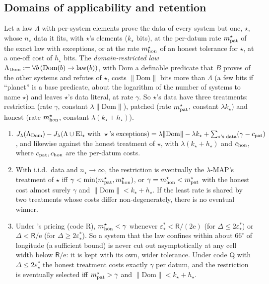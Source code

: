 \subsection{Domains of applicability and retention}\label{app:laws:domains}

Let a law $\Lambda$ with per-system elements prove the data of every system but one, $\star$, whose $n_\star$ data it fits, with $\star$'s elements ($k_\star$ bits), at the per-datum rate $m^\star_{\rm pat}$ of the exact law with exceptions, or at the rate $m^\star_{\rm hon}$ of an honest tolerance for $\star$, at a one-off cost of $h_\star$ bits. The \emph{domain-restricted law} $\Lambda_{\rm Dom}:=\forall b\,(\mathrm{Dom}(b)\to\mathrm{law}(b))$, with $\mathrm{Dom}$ a definable predicate that $B$ proves of the other systems and refutes of $\star$, costs $\lVert\mathrm{Dom}\rVert$ bits more than $\Lambda$ (a few bits if ``planet'' is a base predicate, about the logarithm of the number of systems to name $\star$) and leaves $\star$'s data literal, at rate $\gamma$. So $\star$'s data have three treatments: restriction (rate $\gamma$, constant $\lambda\lVert\mathrm{Dom}\rVert$), patched (rate $m^\star_{\rm pat}$, constant $\lambda k_\star$) and honest (rate $m^\star_{\rm hon}$, constant $\lambda(k_\star+h_\star)$).

\begin{proposition}\label{prop:laws:domain}
\leavevmode
\begin{enumerate}[label=(\alph*),itemsep=1pt,topsep=2pt]
\item $J_\lambda(\Lambda_{\rm Dom})-J_\lambda(\Lambda\cup\mathrm{El}_\star\text{ with }\star\text{'s exceptions})=\lambda\lVert\mathrm{Dom}\rVert-\lambda k_\star+\sum_{\star\text{'s data}}(\gamma-c_{\rm pat})$, and likewise against the honest treatment of $\star$, with $\lambda(k_\star+h_\star)$ and $c_{\rm hon}$, where $c_{\rm pat},c_{\rm hon}$ are the per-datum costs.
\item With i.i.d.\ data and $n_\star\to\infty$, the restriction is eventually the $\lambda$-MAP's treatment of $\star$ iff $\gamma<\min(m^\star_{\rm pat},m^\star_{\rm hon})$, or $\gamma=m^\star_{\rm hon}<m^\star_{\rm pat}$ with the honest cost almost surely $\gamma$ and $\lVert\mathrm{Dom}\rVert<k_\star+h_\star$. If the least rate is shared by two treatments whose costs differ non-degenerately, there is no eventual winner.
\item Under \SAIabbr's pricing (code R), $m^\star_{\rm hon}<\gamma$ whenever $\varepsilon^*_\star<\mathsf R/(2\mathrm e)$ (for $\Delta\le2\varepsilon^*_\star$) or $\Delta<\mathsf R/\mathrm e$ (for $\Delta\ge2\varepsilon^*_\star$). So a system that the law confines within about $66^\circ$ of longitude (a sufficient bound) is never cut out asymptotically at any cell width below $\mathsf R/\mathrm e$: it is kept with its own, wider tolerance. Under code Q with $\Delta\le2\varepsilon^*_\star$ the honest treatment costs exactly $\gamma$ per datum, and the restriction is eventually selected iff $m^\star_{\rm pat}>\gamma$ and $\lVert\mathrm{Dom}\rVert<k_\star+h_\star$.
\end{enumerate}
\end{proposition}


